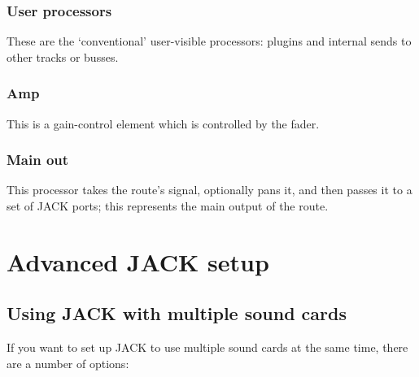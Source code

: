 \documentclass[10pt,a4paper]{book}
\begin{document}
\subsection{User processors}

These are the `conventional' user-visible processors: plugins and
internal sends to other tracks or busses.

\subsection{Amp}

This is a gain-control element which is controlled by the fader.

\subsection{Main out}

This processor takes the route's signal, optionally pans it, and then
passes it to a set of JACK ports; this represents the main output of
the route.


\appendix
\chapter{Advanced JACK setup}
\label{ap:advanced-jack}

\section{Using JACK with multiple sound cards}

If you want to set up JACK to use multiple sound cards at the same
time, there are a number of options:
\end{document}
